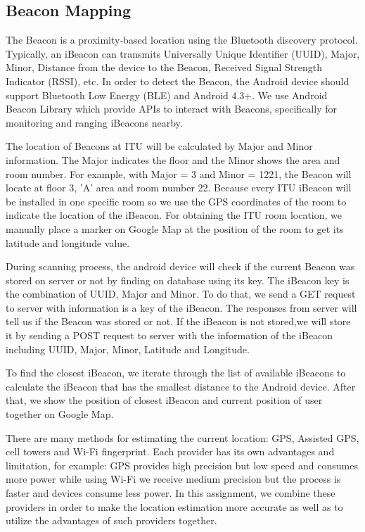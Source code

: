 \documentclass{sigchi}
\begin{document}
\subsection{Beacon Mapping}
The Beacon is a proximity-based location using the Bluetooth discovery protocol.
Typically, an iBeacon can transmits Universally Unique Identifier (UUID), Major, Minor, Distance from the device to the Beacon, Received Signal Strength Indicator (RSSI), etc.
In order to detect the Beacon, the Android device should support Bluetooth Low Energy (BLE) and Android 4.3+.
We use Android Beacon Library which provide APIs to interact with Beacons, specifically for monitoring and ranging iBeacons nearby.

The location of Beacons at ITU will be calculated by Major and Minor information.
The Major indicates the floor and the Minor shows the area and room number.
For example, with Major = 3 and Minor = 1221, the Beacon will locate at floor 3, 'A' area and room number 22.
Because every ITU iBeacon will be installed in one specific room so we use the GPS coordinates of the room to indicate the location of the iBeacon.
For obtaining the ITU room location, we manually place a marker on Google Map at the position of the room to get its latitude and longitude value. 

During scanning process, the android device will check if the current Beacon was stored on server or not by finding on database using its key.
The iBeacon key is the combination of UUID, Major and Minor.
To do that, we send a GET request to server with information is a key of the iBeacon.
The responses from server will tell us if the Beacon was stored or not.
If the iBeacon is not stored,we will store it by sending a POST request to server with the information of the iBeacon including UUID, Major, Minor, Latitude and Longitude.

To find the closest iBeacon, we iterate through the list of available iBeacons to calculate the iBeacon that has the smallest distance to the Android device. After that, we show the position of closest iBeacon and current position of user together on Google Map.

There are many methods for estimating the current location: GPS, Assisted GPS, cell towers and Wi-Fi fingerprint.
Each provider has its own advantages and limitation, for example: GPS provides high precision but low speed and consumes more power while using Wi-Fi we receive medium precision but the process is faster and devices consume less power.
In this assignment, we combine these providers in order to make the location estimation more accurate as well as to utilize the advantages of such providers together. 
\end{document}
